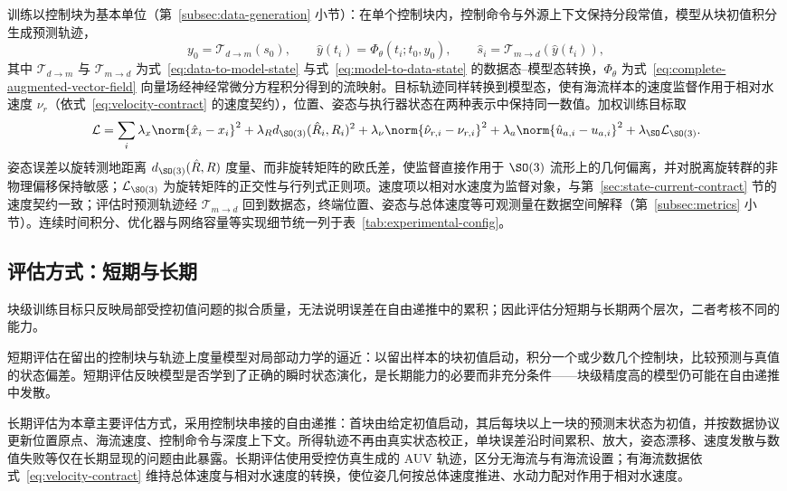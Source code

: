 训练以控制块为基本单位（第~\ref{subsec:data-generation} 小节）：在单个控制块内，控制命令与外源上下文保持分段常值，模型从块初值积分生成预测轨迹，
\begin{equation}
  y_0=\mathcal{T}_{d\to m}(s_0),\qquad
  \hat y(t_i)=\Phi_\theta(t_i;t_0,y_0),\qquad
  \hat s_i=\mathcal{T}_{m\to d}(\hat y(t_i)),
  \label{eq:block-prediction}
\end{equation}
其中 \(\mathcal{T}_{d\to m}\) 与 \(\mathcal{T}_{m\to d}\) 为式~\eqref{eq:data-to-model-state} 与式~\eqref{eq:model-to-data-state} 的数据态--模型态转换，\(\Phi_\theta\) 为式~\eqref{eq:complete-augmented-vector-field} 向量场经神经常微分方程积分得到的流映射。目标轨迹同样转换到模型态，使有海流样本的速度监督作用于相对水速度 \(\nu_r\)（依式~\eqref{eq:velocity-contract} 的速度契约），位置、姿态与执行器状态在两种表示中保持同一数值。加权训练目标取
\begin{equation}
  \mathcal{L}
  =
  \sum_i
  \lambda_x\norm{\hat x_i-x_i}^2
  +\lambda_R d_{\SO(3)}(\hat R_i,R_i)^2
  +\lambda_\nu\norm{\hat\nu_{r,i}-\nu_{r,i}}^2
  +\lambda_a\norm{\hat u_{a,i}-u_{a,i}}^2
  +\lambda_{\SO}\mathcal{L}_{\SO(3)} .
  \label{eq:training-loss}
\end{equation}
姿态误差以旋转测地距离 \(d_{\SO(3)}(\hat R,R)\) 度量、而非旋转矩阵的欧氏差，使监督直接作用于 \(\SO(3)\) 流形上的几何偏离，并对脱离旋转群的非物理偏移保持敏感；\(\mathcal{L}_{\SO(3)}\) 为旋转矩阵的正交性与行列式正则项。速度项以相对水速度为监督对象，与第~\ref{sec:state-current-contract} 节的速度契约一致；评估时预测轨迹经 \(\mathcal{T}_{m\to d}\) 回到数据态，终端位置、姿态与总体速度等可观测量在数据空间解释（第~\ref{subsec:metrics} 小节）。连续时间积分、优化器与网络容量等实现细节统一列于表~\ref{tab:experimental-config}。

\subsection{评估方式：短期与长期}
\label{subsec:rollout-eval}

块级训练目标只反映局部受控初值问题的拟合质量，无法说明误差在自由递推中的累积；因此评估分短期与长期两个层次，二者考核不同的能力。

短期评估在留出的控制块与轨迹上度量模型对局部动力学的逼近：以留出样本的块初值启动，积分一个或少数几个控制块，比较预测与真值的状态偏差。短期评估反映模型是否学到了正确的瞬时状态演化，是长期能力的必要而非充分条件——块级精度高的模型仍可能在自由递推中发散。

长期评估为本章主要评估方式，采用控制块串接的自由递推：首块由给定初值启动，其后每块以上一块的预测末状态为初值，并按数据协议更新位置原点、海流速度、控制命令与深度上下文。所得轨迹不再由真实状态校正，单块误差沿时间累积、放大，姿态漂移、速度发散与数值失败等仅在长期显现的问题由此暴露。长期评估使用受控仿真生成的 AUV 轨迹，区分无海流与有海流设置；有海流数据依式~\eqref{eq:velocity-contract} 维持总体速度与相对水速度的转换，使位姿几何按总体速度推进、水动力配对作用于相对水速度。

